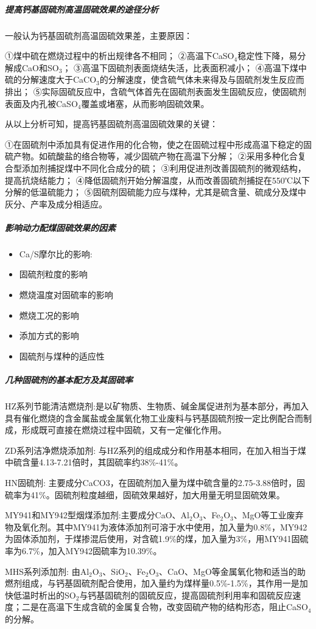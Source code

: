 \documentclass[10pt,openany]{ctexbook}
\begin{document}
\subparagraph{提高钙基固硫剂高温固硫效果的途径分析}
一般认为钙基固硫剂高温固硫效果差，主要原因：\par
①煤中硫在燃烧过程中的析出规律各不相同；
②高温下CaSO$_4$稳定性下降，易分解成CaO和SO$_3$；
③高温下固硫剂表面烧结失活，比表面积减小；
④高温下煤中硫的分解速度大于CaCO$_3$的分解速度，使含硫气体未来得及与固硫剂发生反应而排出；
⑤实际固硫反应中，含硫气体首先在固硫剂表面发生固硫反应，使固硫剂表面及内孔被CaSO$_4$覆盖或堵塞，从而影响固硫效果。\par
从以上分析可知，提高钙基固硫剂高温固硫效果的关键：\par
①在固硫剂中添加具有促进作用的化合物，使之在固硫过程中形成高温下稳定的固硫产物。如硫酸盐的络合物等，减少固硫产物在高温下分解；
    ②采用多种化合复合型添加剂捕捉煤中不同化合成分的硫；
    ③利用促进剂改善固硫剂的微观结构，提高抗烧结能力；
    ④降低固硫剂开始分解温度，从而改善固硫剂捕捉在550℃以下分解的低温硫能力；
    ⑤固硫剂固硫能力应与煤种，尤其是硫含量、硫成分及煤中灰分、产率及成分相适应。
    \subparagraph{影响动力配煤固硫效果的因素}
    \begin{itemize}


\item    Ca/S摩尔比的影响:
\item   固硫剂粒度的影响
\item  燃烧温度对固硫率的影响
\item  燃烧工况的影响
\item  添加方式的影响
\item  固硫剂与煤种的适应性

   \end{itemize}
 \subparagraph{几种固硫剂的基本配方及其固硫率}
 HZ系列节能清洁燃烧剂:是以矿物质、生物质、碱金属促进剂为基本部分，再加入具有催化燃烧的含金属盐或金属氧化物工业废料与钙基固硫剂按一定比例配合而制成，形成既可直接在燃烧过程中固硫，又有一定催化作用。\par
 ZD系列洁净燃烧添加剂:
  与HZ系列的组成成分和作用基本相同，在加入相当于煤中硫含量4.13-7.21倍时，其固硫率约38\%-41\%。\par
  HN固硫剂:
  主要成分CaCO3，在固硫剂加入量为煤中硫含量的2.75-3.88倍时，固硫率为41\%。固硫剂粒度越细，固硫效果越好，加大用量无明显固硫效果。\par
MY941和MY942型烟煤添加剂:主要成分CaO、Al$_2$O$_3$、Fe$_2$O$_3$、MgO等工业废弃物及氧化剂。其中MY941为液体添加剂可溶于水中使用，加入量为0.8\%，MY942为固体添加剂，于煤掺混后使用，对含硫1.9\%的煤，加入量为3\%，用MY941固硫率为6.7\%，加入MY942固硫率为10.39\%。\par
MHS系列添加剂:
由Al$_2$O$_3$、SiO$_2$、Fe$_2$O$_3$、CaO、MgO等金属氧化物和适当的助燃剂组成，与钙基固硫剂配合使用，加入量约为煤样量0.5\%-1.5\%，其作用一是加快低温时析出的SO$_2$与钙基固硫剂的固硫反应，提高固硫剂利用率和固硫反应速度；二是在高温下生成含硫的金属复合物，改变固硫产物的结构形态，阻止CaSO$_4$的分解。
\end{document}
